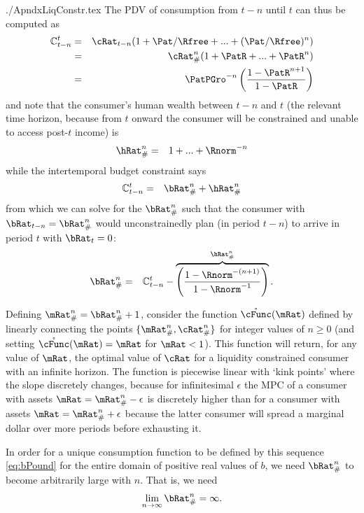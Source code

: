 \documentclass{econtex}
\begin{document}
\begin{verbatimwrite}{./ApndxLiqConstr.tex}
The PDV of consumption from $t-n$ until $t$ can thus be computed as
\begin{eqnarray}
   \mathbb{C}_{t-n}^{t} & = & \cRat_{t-n}(1+\Pat/\Rfree+ ... + (\Pat/\Rfree)^{n}) \notag
\\ & = & \cRat_{\#}^{n}(1+\PatR+ ... + \PatR^{n}) \notag
\\ & = & \PatPGro^{-n}\left(\frac{1-\PatR^{n+1}}{1-\PatR}\right) \label{PDVc}
\end{eqnarray}
and note that the consumer's human wealth between $t-n$ and $t$ (the relevant
time horizon, because from $t$ onward the consumer will be constrained
and unable to access post-$t$ income) is
\begin{eqnarray}
  \hRat_{\#}^{n} & = & 1+...+\Rnorm^{-n}
\end{eqnarray}
while the intertemporal budget constraint says
\begin{eqnarray*}
  \mathbb{C}_{t-n}^{t} & = & \bRat_{\#}^{n}+\hRat_{\#}^{n}
\end{eqnarray*}
from which we can solve for the $\bRat_{\#}^{n}$ such that
the consumer with $\bRat_{t-n} = \bRat_{\#}^{n}$ would
unconstrainedly plan (in period $t-n$) to arrive in period $t$ with
$\bRat_{t}=0$:
\begin{eqnarray}
\bRat_{\#}^{n} & =&  \mathbb{C}_{t-n}^{t} - \overbrace{\left(\frac{1-\Rnorm^{-(n+1)}}{1-\Rnorm^{-1}}\right)}^{\hRat_{\#}^{n}} \label{eq:bPound}.
\end{eqnarray}

Defining $\mRat_{\#}^{n}=\bRat_{\#}^{n}+1$, consider the function
$\mathring{\cFunc}(\mRat)$ defined by linearly connecting the points
$\{\mRat_{\#}^{n},\cRat_{\#}^{n}\}$ for integer values of $n \geq 0$
(and setting $\mathring{\cFunc}(\mRat)=\mRat$ for $\mRat<1$).  This
function will return, for any value of $\mRat$, the optimal value of
$\cRat$ for a liquidity constrained consumer with an infinite horizon.
The function is piecewise linear with `kink points' where the slope
discretely changes, because for infinitesimal $\epsilon$ the MPC of a
consumer with assets $\mRat=\mRat_{\#}^{n}-\epsilon$ is discretely
higher than for a consumer with assets $\mRat=\mRat_{\#}^{n}+\epsilon$
because the latter consumer will spread a marginal dollar over more
periods before exhausting it.

In order for a unique consumption function to be defined by this
sequence \eqref{eq:bPound} for the entire domain of positive real
values of $b$, we need $\bRat_{\#}^{n}$ to become arbitrarily large with
$n$.  That is, we need
\begin{eqnarray}
  \lim_{n \rightarrow \infty} \bRat_{\#}^{n} = \infty. \label{eq:bToInfty}
\end{eqnarray}


\end{verbatimwrite}
\end{document}
